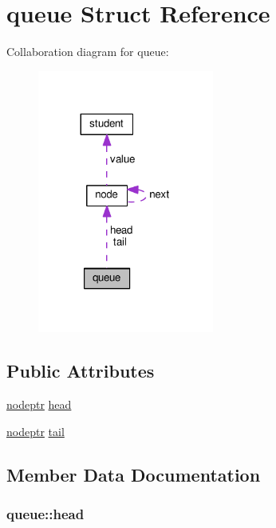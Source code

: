 \hypertarget{structqueue}{}\section{queue Struct Reference}
\label{structqueue}


Collaboration diagram for queue\+:
\nopagebreak
\begin{figure}[H]
\begin{center}
\leavevmode
\includegraphics[width=164pt]{structqueue__coll__graph}
\end{center}
\end{figure}
\subsection*{Public Attributes}
\begin{DoxyCompactItemize}
\item 
\hyperlink{StudentList_8c_a0bfdc21bc19acf8a0ac274ebd1b6304a}{nodeptr} \hyperlink{structqueue_a23e9f810057d92adf24e3278dfe7865f}{head}
\item 
\hyperlink{StudentList_8c_a0bfdc21bc19acf8a0ac274ebd1b6304a}{nodeptr} \hyperlink{structqueue_a827de955c3490873a13e63e5478b444b}{tail}
\end{DoxyCompactItemize}


\subsection{Member Data Documentation}
\subsubsection[{\texorpdfstring{head}{head}}]{ queue\+::head}\hypertarget{structqueue_a23e9f810057d92adf24e3278dfe7865f}{}\label{structqueue_a23e9f810057d92adf24e3278dfe7865f}
